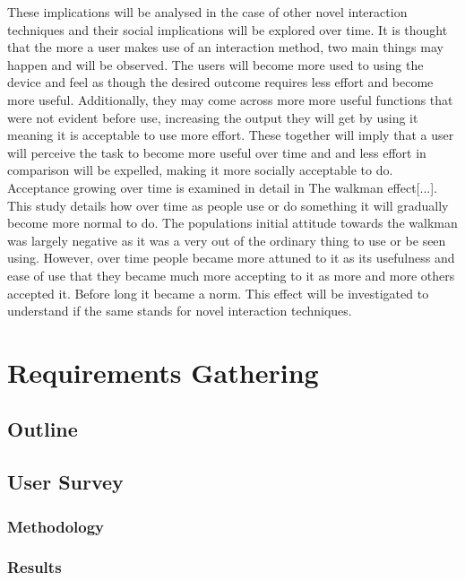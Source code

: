 \documentclass{l4proj}
\begin{document}
These implications will be analysed in the case of other novel interaction techniques and their social implications will be explored over time. It is thought that the more a user makes use of an interaction method, two main things may happen and will be observed. The users will become more used to using the device and feel as though the desired outcome requires less effort and become more useful. Additionally, they may come across more more useful functions that were not evident before use, increasing the output they will get by using it meaning it is acceptable to use more effort. These together will imply that a user will perceive the task to become more useful over time and and less effort in comparison will be expelled, making it more socially acceptable to do. Acceptance growing over time is examined in detail in The walkman effect[...]. This study details how over time as people use or do something it will gradually become more normal to do. The populations initial attitude towards the walkman was largely negative as it was a very out of the ordinary thing to use or be seen using. However, over time people became more attuned to it as its usefulness and ease of use that they became much more accepting to it as more and more others accepted it. Before long it became a norm. This effect will be investigated to understand if the same stands for novel interaction techniques.



\chapter{Requirements Gathering}

\section{Outline}

\section{User Survey
}
\subsection{Methodology}

\subsection{Results}
\end{document}
